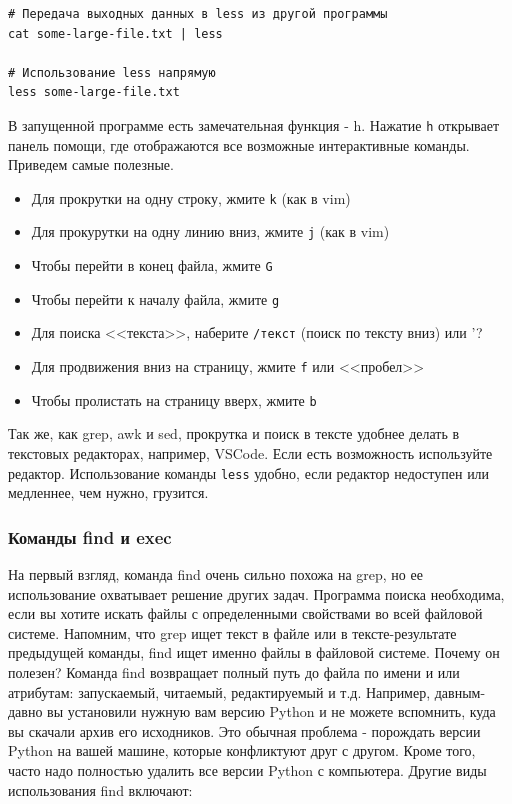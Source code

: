 \documentclass[12pt]{article}
\providecommand{\tightlist}{%
  \setlength{\itemsep}{0pt}\setlength{\parskip}{0pt}}
\begin{document}
\begin{verbatim}
# Передача выходных данных в less из другой программы
cat some-large-file.txt | less

# Использование less напрямую
less some-large-file.txt
\end{verbatim}

В запущенной программе есть замечательная функция - h. Нажатие
\texttt{h} открывает панель помощи, где отображаются все возможные
интерактивные команды. Приведем самые полезные.

\begin{itemize}
\tightlist
\item
  Для прокрутки на одну строку, жмите \texttt{k} (как в vim)
\item
  Для прокурутки на одну линию вниз, жмите \texttt{j} (как в vim)
\item
  Чтобы перейти в конец файла, жмите \texttt{G}
\item
  Чтобы перейти к началу файла, жмите \texttt{g}
\item
  Для поиска <<текста>>, наберите \texttt{/текст} (поиск по тексту вниз)
  или '?
\item
  Для продвижения вниз на страницу, жмите \texttt{f} или <<пробел>>
\item
  Чтобы пролистать на страницу вверх, жмите \texttt{b}
\end{itemize}

Так же, как grep, awk и sed, прокрутка и поиск в тексте удобнее делать в
текстовых редакторах, например, VSCode. Если есть возможность
используйте редактор. Использование команды \texttt{less} удобно, если
редактор недоступен или медленнее, чем нужно, грузится.

\hypertarget{find-and-exec}{%
\subsubsection{\texorpdfstring{\protect\hyperlink{find-and-exec}{}Команды
find и exec}{Команды find и exec}}\label{find-and-exec}}

На первый взгляд, команда find очень сильно похожа на grep, но ее
использование охватывает решение других задач. Программа поиска
необходима, если вы хотите искать файлы с определенными свойствами во
всей файловой системе. Напомним, что grep ищет текст в файле или в
тексте-результате предыдущей команды, find ищет именно файлы в файловой
системе. Почему он полезен? Команда find возвращает полный путь до файла
по имени и или атрибутам: запускаемый, читаемый, редактируемый и т.д.
Например, давным-давно вы установили нужную вам версию Python и не
можете вспомнить, куда вы скачали архив его исходников. Это обычная
проблема - порождать версии Python на вашей машине, которые конфликтуют
друг с другом. Кроме того, часто надо полностью удалить все версии
Python с компьютера. Другие виды использования find включают:
\end{document}
